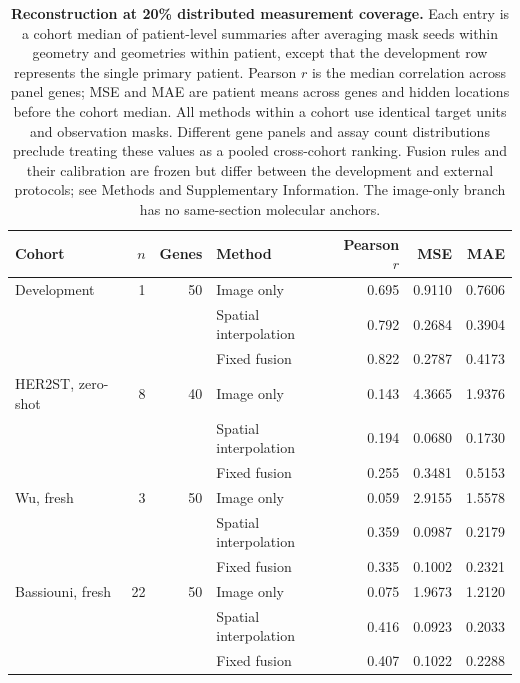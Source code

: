 \begin{table}[!htbp]
\caption{\textbf{Reconstruction at 20\% distributed measurement coverage.} Each entry is a cohort median of patient-level summaries after averaging mask seeds within geometry and geometries within patient, except that the development row represents the single primary patient. Pearson $r$ is the median correlation across panel genes; MSE and MAE are patient means across genes and hidden locations before the cohort median. All methods within a cohort use identical target units and observation masks. Different gene panels and assay count distributions preclude treating these values as a pooled cross-cohort ranking. Fusion rules and their calibration are frozen but differ between the development and external protocols; see Methods and Supplementary Information. The image-only branch has no same-section molecular anchors.}
\label{tab:performance}
\centering\small
\begin{tabularx}{\textwidth}{@{}Yrrlrrr@{}}
\toprule
Cohort & $n$ & Genes & Method & Pearson $r$ & MSE & MAE \\
\midrule
Development & 1 & 50 & Image only & 0.695 & 0.9110 & 0.7606 \\
 &  &  & Spatial interpolation & 0.792 & 0.2684 & 0.3904 \\
 &  &  & Fixed fusion & 0.822 & 0.2787 & 0.4173 \\
\addlinespace[5pt]
HER2ST, zero-shot & 8 & 40 & Image only & 0.143 & 4.3665 & 1.9376 \\
 &  &  & Spatial interpolation & 0.194 & 0.0680 & 0.1730 \\
 &  &  & Fixed fusion & 0.255 & 0.3481 & 0.5153 \\
\addlinespace[5pt]
Wu, fresh & 3 & 50 & Image only & 0.059 & 2.9155 & 1.5578 \\
 &  &  & Spatial interpolation & 0.359 & 0.0987 & 0.2179 \\
 &  &  & Fixed fusion & 0.335 & 0.1002 & 0.2321 \\
\addlinespace[5pt]
Bassiouni, fresh & 22 & 50 & Image only & 0.075 & 1.9673 & 1.2120 \\
 &  &  & Spatial interpolation & 0.416 & 0.0923 & 0.2033 \\
 &  &  & Fixed fusion & 0.407 & 0.1022 & 0.2288 \\
\bottomrule
\end{tabularx}
\end{table}

